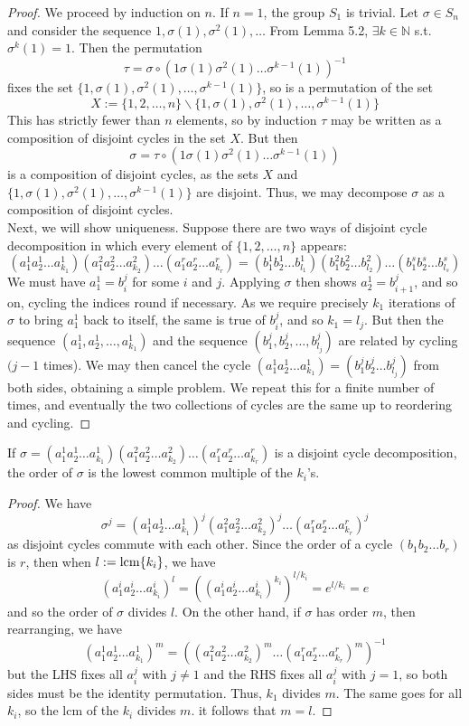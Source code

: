\documentclass[a4paper]{article}
\begin{document}
\begin{proof}
We proceed by induction on $n$. If $n=1$, the group $S_1$ is trivial. Let $\sigma\in S_n$ and consider the sequence $1,\sigma(1),\sigma^2(1),\dots$ From Lemma 5.2, $\exists k\in\mathbb{N}$ s.t. $\sigma^k(1)=1$. Then the permutation
$$\tau=\sigma\circ(1\sigma(1)\sigma^2(1)\dots\sigma^{k-1}(1))^{-1}$$
fixes the set $\{1,\sigma(1),\sigma^2(1),\dots,\sigma^{k-1}(1)\}$, so is a permutation of the set $$X:=\{1,2,\dots,n\}\backslash\{1,\sigma(1),\sigma^2(1),\dots,\sigma^{k-1}(1)\}$$
This has strictly fewer than $n$ elements, so by induction $\tau$ may be written as a composition of disjoint cycles in the set $X$. But then
$$\sigma=\tau\circ(1\sigma(1)\sigma^2(1)\dots\sigma^{k-1}(1))$$
is a composition of disjoint cycles, as the sets $X$ and $\{1,\sigma(1),\sigma^2(1),\dots,\sigma^{k-1}(1)\}$ are disjoint. Thus, we may decompose $\sigma$ as a composition of disjoint cycles.\\[5pt]
Next, we will show uniqueness. Suppose there are two ways of disjoint cycle decomposition in which every element of $\{1,2,\dots,n\}$ appears:
$$(a_1^1a_2^1\dots a_{k_1}^1)(a_1^2a_2^2\dots a_{k_2}^2)\dots(a_1^ra_2^r\dots a_{k_r}^r)=(b_1^1b_2^1\dots b_{l_1}^1)(b_1^2b_2^2\dots b_{l_2}^2)\dots(b_1^sb_2^s\dots b_{l_s}^s)$$
We must have $a_1^1=b_i^j$ for some $i$ and $j$. Applying $\sigma$ then shows $a_2^1=b_{i+1}^j$, and so on, cycling the indices round if necessary. As we require precisely $k_1$ iterations of $\sigma$ to bring $a_1^1$ back to itself, the same is true of $b_i^j$, and so $k_1=l_j$. But then the sequence $(a_1^1,a_2^1,\dots,a_{k_1}^1)$ and the sequence $(b_1^j,b_2^j,\dots,b_{l_j}^j)$ are related by cycling $(j-1$ times). We may then cancel the cycle $(a_1^1a_2^1\dots a_{k_1}^1)=(b_1^jb_2^j\dots b_{l_j}^j)$ from both sides, obtaining a simple problem. We repeat this for a finite number of times, and eventually the two collections of cycles are the same up to reordering and cycling.
\end{proof} 
\begin{lemma}
If $\sigma=(a_1^1a_2^1\dots a_{k_1}^1)(a_1^2a_2^2\dots a_{k_2}^2)\dots(a_1^ra_2^r\dots a_{k_r}^r)$ is a disjoint cycle decomposition, the order of $\sigma$ is the lowest common multiple of the $k_i$'s.
\end{lemma}
\begin{proof}
We have
$$\sigma^j=(a_1^1a_2^1\dots a_{k_1}^1)^j(a_1^2a_2^2\dots a_{k_2}^2)^j\dots(a_1^ra_2^r\dots a_{k_r}^r)^j$$
as disjoint cycles commute with each other. Since the order of a cycle $(b_1b_2\dots b_r)$ is $r$, then when $l:=\operatorname{lcm}\{k_i\}$, we have
$$(a_1^ia_2^i\dots a_{k_i}^i)^l=((a_1^ia_2^i\dots a_{k_i}^i)^{k_i})^{l/k_i}=e^{l/k_i}=e$$
and so the order of $\sigma$ divides $l$. On the other hand, if $\sigma$ has order $m$, then rearranging, we have
$$(a_1^1a_2^1\dots a_{k_1}^1)^m=((a_1^2a_2^2\dots a_{k_2}^2)^m\dots(a_1^ra_2^r\dots a_{k_r}^r)^m)^{-1}$$
but the LHS fixes all $a_i^j$ with $j\neq1$ and the RHS fixes all $a_i^j$ with $j=1$, so both sides must be the identity permutation. Thus, $k_1$ divides $m$. The same goes for all $k_i$, so the lcm of the $k_i$ divides $m$. it follows that $m=l$.
\end{proof}
\newpage
\end{document}
